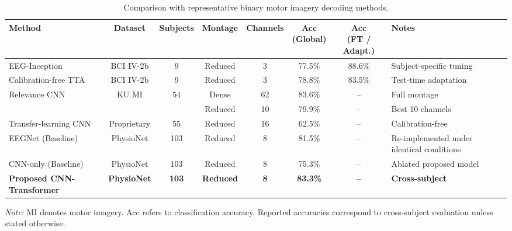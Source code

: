 \documentclass[a4paper,fleqn]{cas-dc}
\begin{document}
\begin{table}[t!]
\centering
\caption{Comparison with representative binary motor imagery decoding methods.}
\label{tab:sota_binary}
\footnotesize
\begin{threeparttable}
\begin{tabular}{@{} >{\raggedright\arraybackslash}p{4cm} c c c c c c >{\raggedright\arraybackslash}p{3.5cm} @{}}
\toprule
Method & Dataset & Subjects & Montage & Channels & \makecell{Acc \\ (Global)} & \makecell{Acc \\ (FT / Adapt.)} & Notes \\
\midrule
EEG-Inception \citep{zhang2021eeg} & BCI IV-2b & 9 & Reduced & 3 & 77.5\% & 88.6\% & Subject-specific tuning \\
\addlinespace
Calibration-free TTA \citep{wimpff2024calibration} & BCI IV-2b & 9 & Reduced & 3 & 78.8\% & 83.5\% & Test-time adaptation \\
\addlinespace
Relevance CNN \citep{nagarajan2023relevance} & \multirow{2}{*}{KU MI} & \multirow{2}{*}{54} & Dense & 62 & 83.6\% & -- & Full montage \\
 & & & Reduced & 10 & 79.9\% & -- & Best 10 channels \\
\addlinespace
Transfer-learning CNN \citep{alimardani2023end} & Proprietary & 55 & Reduced & 16 & 62.5\% & -- & Calibration-free \\
\addlinespace
EEGNet \citep{lawhern2018eegnet} (Baseline) & PhysioNet & 103 & Reduced & 8 & 81.5\% & -- & Re-implemented under identical conditions \\
\addlinespace
CNN-only (Baseline) & PhysioNet & 103 & Reduced & 8 & 75.3\% & -- & Ablated proposed model \\
\addlinespace
\rowcolor[gray]{0.9}
\textbf{Proposed CNN-Transformer} & \textbf{PhysioNet} & \textbf{103} & \textbf{Reduced} & \textbf{8} & \textbf{83.3\%} & \textbf{--} & \textbf{Cross-subject} \\
\bottomrule
\end{tabular}
\begin{tablenotes}
    \item \textit{Note:} MI denotes motor imagery. Acc refers to classification accuracy. Reported accuracies correspond to cross-subject evaluation unless stated otherwise.
\end{tablenotes}
\end{threeparttable}
\end{table}
\end{document}
